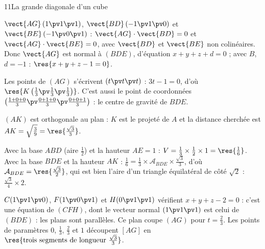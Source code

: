 \begin{corrige}{11}{La grande diagonale d'un cube}
\begin{questions}
  \item $\vect{AG}\,(1\pv1\pv1)$, $\vect{BD}\,(-1\pv1\pv0)$ et $\vect{BE}\,(-1\pv0\pv1)$ : $\vect{AG}\cdot\vect{BD}=0$ et
    $\vect{AG}\cdot\vect{BE}=0$, avec $\vect{BD}$ et $\vect{BE}$ non colinéaires. Donc $\vect{AG}$ est normal à $(BDE)$, d'équation
    $x+y+z+d=0$ ; avec $B$, $d=-1$ : $\res{x+y+z-1=0}$.
  \item Les points de $(AG)$ s'écrivent $(t\pv t\pv t)$ : $3t-1=0$, d'où $\res{K\left(\tfrac13\pv\tfrac13\pv\tfrac13\right)}$. C'est
    aussi le point de coordonnées $\left(\frac{1+0+0}{3}\pv\frac{0+1+0}{3}\pv\frac{0+0+1}{3}\right)$ : le centre de gravité de $BDE$.
  \item $(AK)$ est orthogonale au plan : $K$ est le projeté de $A$ et la distance cherchée est $AK=\sqrt{\frac39}=\res{\tfrac{\sqrt3}{3}}$.
  \item Avec la base $ABD$ (aire $\frac12$) et la hauteur $AE=1$ : $V=\frac13\times\frac12\times1=\res{\tfrac16}$. Avec la base $BDE$ et la
    hauteur $AK$ : $\frac16=\frac13\times\mathcal{A}_{BDE}\times\frac{\sqrt3}{3}$, d'où $\mathcal{A}_{BDE}=\res{\tfrac{\sqrt3}{2}}$, qui est
    bien l'aire d'un triangle équilatéral de côté $\sqrt2$ : $\frac{\sqrt3}{4}\times2$.
  \item $C(1\pv1\pv0)$, $F(1\pv0\pv1)$ et $H(0\pv1\pv1)$ vérifient $x+y+z-2=0$ : c'est une équation de $(CFH)$, dont le vecteur normal
    $(1\pv1\pv1)$ est celui de $(BDE)$ : les plans sont parallèles. Ce plan coupe $(AG)$ pour $t=\frac23$. Les points de paramètres
    $0$, $\frac13$, $\frac23$ et $1$ découpent $[AG]$ en $\res{\text{trois segments de longueur }\tfrac{\sqrt3}{3}}$.
\end{questions}
\end{corrige}
